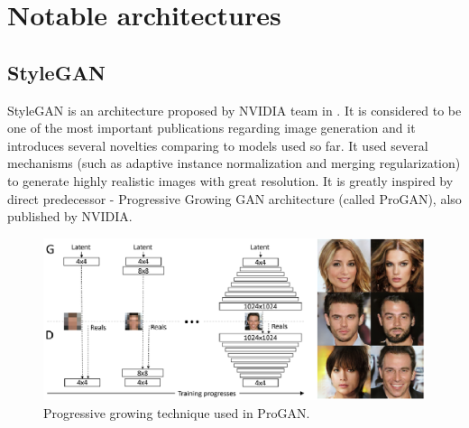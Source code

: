 \documentclass[12pt,a4paper,openany]{book}
\begin{document}


\chapter{Notable architectures}
\section{StyleGAN}

StyleGAN is an architecture proposed by NVIDIA team in \cite{stylegan}. It is considered to be one of the most important publications regarding image generation and it introduces several novelties comparing to models used so far. It used several mechanisms (such as adaptive instance normalization and merging regularization) to generate highly realistic images with great resolution. It is greatly inspired by direct predecessor - Progressive Growing GAN architecture (called ProGAN), also published by NVIDIA.

\begin{figure}[ht!]
    \centering
    \includegraphics[scale=1.0]{figs/progan-scheme.eps}
    \caption{Progressive growing technique used in ProGAN.}\label{Fig:PROGAN}
\end{figure}
\end{document}
